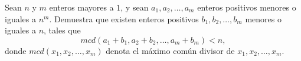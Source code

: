 Sean $n$ y $m$ enteros mayores a $1$, y sean $a_1, a_2, \dots , a_m$ enteros positivos menores o
iguales a $n^m$. Demuestra que existen enteros positivos $b_1, b_2, \dots , b_m$ menores o iguales a $n$, tales que
\[mcd(a_1 + b_1, a_2 + b_2, \dots , a_m + b_m) \lt n,\]
donde $mcd(x_1, x_2, \dots , x_m)$ denota el máximo común divisor de $x_1, x_2, \dots , x_m$.
